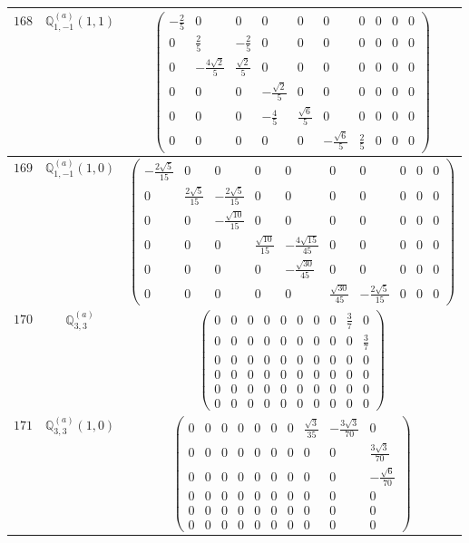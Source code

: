 \documentclass[fleqn,8pt,landscape]{jsarticle}
\begin{document}
\begin{center}
\begin{longtable}{ccc}
$ 168 $ & $ \mathbb{Q}_{1,-1}^{(a)}(1,1) $ & $ \begin{pmatrix} - \frac{2}{5} & 0 & 0 & 0 & 0 & 0 & 0 & 0 & 0 & 0 \\ 0 & \frac{2}{5} & - \frac{2}{5} & 0 & 0 & 0 & 0 & 0 & 0 & 0 \\ 0 & - \frac{4 \sqrt{2}}{5} & \frac{\sqrt{2}}{5} & 0 & 0 & 0 & 0 & 0 & 0 & 0 \\ 0 & 0 & 0 & - \frac{\sqrt{2}}{5} & 0 & 0 & 0 & 0 & 0 & 0 \\ 0 & 0 & 0 & - \frac{4}{5} & \frac{\sqrt{6}}{5} & 0 & 0 & 0 & 0 & 0 \\ 0 & 0 & 0 & 0 & 0 & - \frac{\sqrt{6}}{5} & \frac{2}{5} & 0 & 0 & 0 \end{pmatrix} $ \\ \hline
$ 169 $ & $ \mathbb{Q}_{1,-1}^{(a)}(1,0) $ & $ \begin{pmatrix} - \frac{2 \sqrt{5}}{15} & 0 & 0 & 0 & 0 & 0 & 0 & 0 & 0 & 0 \\ 0 & \frac{2 \sqrt{5}}{15} & - \frac{2 \sqrt{5}}{15} & 0 & 0 & 0 & 0 & 0 & 0 & 0 \\ 0 & 0 & - \frac{\sqrt{10}}{15} & 0 & 0 & 0 & 0 & 0 & 0 & 0 \\ 0 & 0 & 0 & \frac{\sqrt{10}}{15} & - \frac{4 \sqrt{15}}{45} & 0 & 0 & 0 & 0 & 0 \\ 0 & 0 & 0 & 0 & - \frac{\sqrt{30}}{45} & 0 & 0 & 0 & 0 & 0 \\ 0 & 0 & 0 & 0 & 0 & \frac{\sqrt{30}}{45} & - \frac{2 \sqrt{5}}{15} & 0 & 0 & 0 \end{pmatrix} $ \\ \hline
$ 170 $ & $ \mathbb{Q}_{3,3}^{(a)} $ & $ \begin{pmatrix} 0 & 0 & 0 & 0 & 0 & 0 & 0 & 0 & \frac{3}{7} & 0 \\ 0 & 0 & 0 & 0 & 0 & 0 & 0 & 0 & 0 & \frac{3}{7} \\ 0 & 0 & 0 & 0 & 0 & 0 & 0 & 0 & 0 & 0 \\ 0 & 0 & 0 & 0 & 0 & 0 & 0 & 0 & 0 & 0 \\ 0 & 0 & 0 & 0 & 0 & 0 & 0 & 0 & 0 & 0 \\ 0 & 0 & 0 & 0 & 0 & 0 & 0 & 0 & 0 & 0 \end{pmatrix} $ \\ \hline
$ 171 $ & $ \mathbb{Q}_{3,3}^{(a)}(1,0) $ & $ \begin{pmatrix} 0 & 0 & 0 & 0 & 0 & 0 & 0 & \frac{\sqrt{3}}{35} & - \frac{3 \sqrt{3}}{70} & 0 \\ 0 & 0 & 0 & 0 & 0 & 0 & 0 & 0 & 0 & \frac{3 \sqrt{3}}{70} \\ 0 & 0 & 0 & 0 & 0 & 0 & 0 & 0 & 0 & - \frac{\sqrt{6}}{70} \\ 0 & 0 & 0 & 0 & 0 & 0 & 0 & 0 & 0 & 0 \\ 0 & 0 & 0 & 0 & 0 & 0 & 0 & 0 & 0 & 0 \\ 0 & 0 & 0 & 0 & 0 & 0 & 0 & 0 & 0 & 0 \end{pmatrix} $ \\ \hline

\end{longtable}
\end{center}
\end{document}
